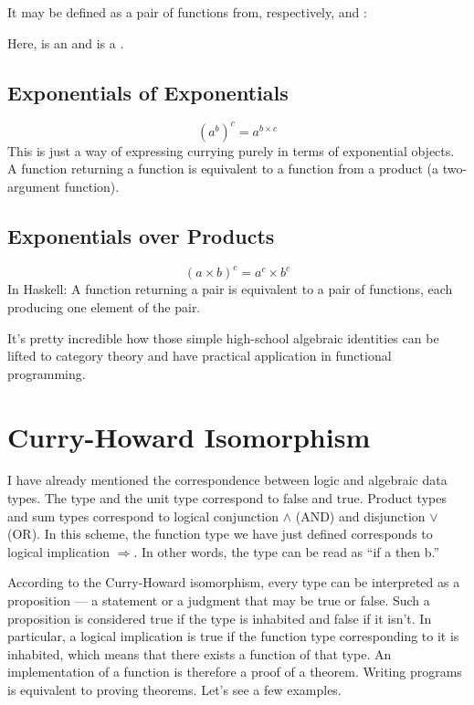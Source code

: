 It may be defined as a pair of functions from, respectively,
 and :

Here,  is an  and  is a .

\subsection{Exponentials of Exponentials}

\[(a^{b})^{c} = a^{b \times c}\]
This is just a way of expressing currying purely in terms of exponential
objects. A function returning a function is equivalent to a function
from a product (a two-argument function).

\subsection{Exponentials over Products}

\[(a \times b)^{c} = a^{c} \times b^{c}\]
In Haskell: A function returning a pair is equivalent to a pair of
functions, each producing one element of the pair.

It's pretty incredible how those simple high-school algebraic identities
can be lifted to category theory and have practical application in
functional programming.

\section{Curry-Howard Isomorphism}

I have already mentioned the correspondence between logic and algebraic
data types. The  type and the unit type \code{()}
correspond to false and true. Product types and sum types correspond to
logical conjunction $\wedge$ (AND) and disjunction $\vee$ (OR). In this scheme, the
function type we have just defined corresponds to logical implication $\Rightarrow$.
In other words, the type  can be read as ``if
a then b.''

According to the Curry-Howard isomorphism, every type can be interpreted
as a proposition --- a statement or a judgment that may be true or
false. Such a proposition is considered true if the type is inhabited
and false if it isn't. In particular, a logical implication is true if
the function type corresponding to it is inhabited, which means that
there exists a function of that type. An implementation of a function is
therefore a proof of a theorem. Writing programs is equivalent to
proving theorems. Let's see a few examples.

